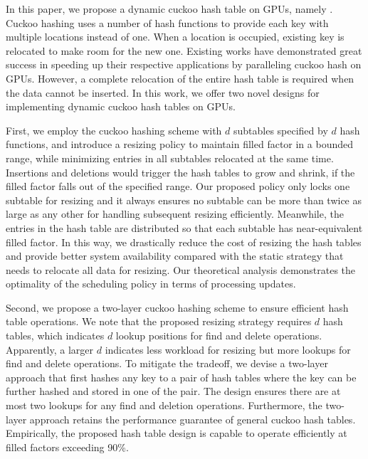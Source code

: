 In this paper, we propose a dynamic cuckoo hash table on GPUs, namely \voter. Cuckoo hashing \cite{pagh2004cuckoo} uses a number of hash functions to provide each key with multiple locations instead of one. When a location is occupied, existing key is relocated to make room for the new one. Existing works \cite{alcantara2009real,alcantara2011building,zhang2015mega,breslow2016horton} have demonstrated great success in speeding up their respective applications by paralleling cuckoo hash on GPUs. 
However, a complete relocation of the entire hash table is required when the data cannot be  inserted.
In this work, we offer two novel designs for implementing dynamic cuckoo hash tables on GPUs.

First, we employ the cuckoo hashing scheme with $d$ subtables specified by $d$ hash functions, and introduce a resizing policy to maintain filled factor in a bounded range, while minimizing entries in all subtables relocated at the same time. Insertions and deletions would trigger the hash tables to grow and shrink, if the filled factor falls out of the specified range. 
Our proposed policy only locks one subtable for resizing and it always ensures no subtable can be more than twice as large as any other for handling subsequent resizing efficiently. Meanwhile, the entries in the hash table are distributed so that each subtable has near-equivalent filled factor.
In this way, we drastically reduce the cost of resizing the hash tables and provide better system availability compared with the static strategy that needs to relocate all data for resizing.
Our theoretical analysis demonstrates the optimality of the scheduling policy in terms of processing updates. 

Second, we propose a two-layer cuckoo hashing scheme to ensure efficient hash table operations. 
We note that the proposed resizing strategy requires $d$ hash tables, which indicates $d$ lookup positions for find and delete operations. Apparently, a larger $d$ indicates less workload for resizing but more lookups for find and delete operations. To mitigate the tradeoff, we devise a two-layer approach that first hashes any key to a pair of hash tables where the key can be further hashed and stored in one of the pair. 
The design ensures there are at most two lookups for any find and deletion operations.
Furthermore, the two-layer approach retains the performance guarantee of general cuckoo hash tables.
Empirically, the proposed hash table design is capable to operate efficiently at filled factors exceeding 90\%.

